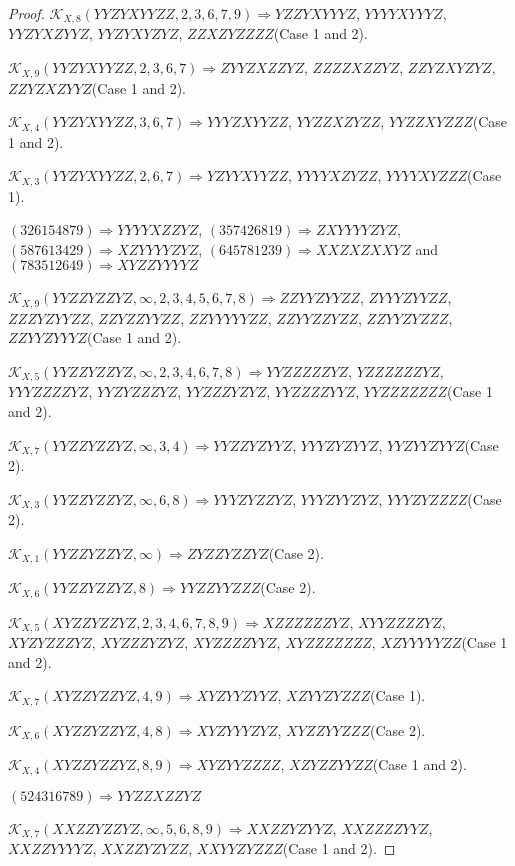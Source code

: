 \documentclass[12pt]{article}
\theoremstyle{plain}
\theoremstyle{definition}
\theoremstyle{remark}
\newcommand{\fancy}[1]{\mathcal{#1}}
\def\K{\fancy{K}}
\begin{document}
\begin{proof}
	
	$\K_{X,8}(YYZYXYYZZ,2, 3, 6, 7, 9)\Rightarrow $$YZZYXYYYZ$, $YYYYXYYYZ$, $YYZYXZYYZ$, $YYZYXYZYZ$, $ZZXZYZZZZ$(Case 1 and 2).
	
	$\K_{X,9}(YYZYXYYZZ,2, 3, 6, 7)\Rightarrow $$ZYYZXZZYZ$, $ZZZZXZZYZ$, $ZZYZXYZYZ$, $ZZYZXZYYZ$(Case 1 and 2).
	
	$\K_{X,4}(YYZYXYYZZ,3, 6, 7)\Rightarrow $$YYYZXYYZZ$, $YYZZXZYZZ$, $YYZZXYZZZ$(Case 1 and 2).
	
	$\K_{X,3}(YYZYXYYZZ,2, 6, 7)\Rightarrow $$YZYYXYYZZ$, $YYYYXZYZZ$, $YYYYXYZZZ$(Case 1).
	
	
	
	$(3 2 6 1 5 4 8 7 9)\Rightarrow YYYYXZZYZ$, $(3 5 7 4 2 6 8 1 9)\Rightarrow ZXYYYYZYZ$, $(5 8 7 6 1 3 4 2 9)\Rightarrow XZYYYYZYZ$, $(6 4 5 7 8 1 2 3 9)\Rightarrow XXZXZXXYZ$ and $(7 8 3 5 1 2 6 4 9)\Rightarrow XYZZYYYYZ$
	
	
	$\K_{X,9}(YYZZYZZYZ,\infty,2, 3, 4, 5, 6, 7, 8)\Rightarrow $$ZZYYZYYZZ$, $ZYYYZYYZZ$, $ZZZYZYYZZ$, $ZZYZZYYZZ$, $ZZYYYYYZZ$, $ZZYYZZYZZ$, $ZZYYZYZZZ$, $ZZYYZYYYZ$(Case 1 and 2).
	
	$\K_{X,5}(YYZZYZZYZ,\infty,2, 3, 4, 6, 7, 8)\Rightarrow $$YYZZZZZYZ$, $YZZZZZZYZ$, $YYYZZZZYZ$, $YYZYZZZYZ$, $YYZZZYZYZ$, $YYZZZZYYZ$, $YYZZZZZZZ$(Case 1 and 2).
	
	$\K_{X,7}(YYZZYZZYZ,\infty,3, 4)\Rightarrow $$YYZZYZYYZ$, $YYYZYZYYZ$, $YYZYYZYYZ$(Case 2).
	
	$\K_{X,3}(YYZZYZZYZ,\infty,6, 8)\Rightarrow $$YYYZYZZYZ$, $YYYZYYZYZ$, $YYYZYZZZZ$(Case 2).
	
	$\K_{X,1}(YYZZYZZYZ,\infty)\Rightarrow $$ZYZZYZZYZ$(Case 2).
	
	$\K_{X,6}(YYZZYZZYZ,8)\Rightarrow $$YYZZYYZZZ$(Case 2).
	
	$\K_{X,5}(XYZZYZZYZ,2, 3, 4, 6, 7, 8, 9)\Rightarrow $$XZZZZZZYZ$, $XYYZZZZYZ$, $XYZYZZZYZ$, $XYZZZYZYZ$, $XYZZZZYYZ$, $XYZZZZZZZ$, $XZYYYYYZZ$(Case 1 and 2).
	
	$\K_{X,7}(XYZZYZZYZ,4, 9)\Rightarrow $$XYZYYZYYZ$, $XZYYZYZZZ$(Case 1).
	
	$\K_{X,6}(XYZZYZZYZ,4, 8)\Rightarrow $$XYZYYYZYZ$, $XYZZYYZZZ$(Case 2).
	
	$\K_{X,4}(XYZZYZZYZ,8, 9)\Rightarrow $$XYZYYZZZZ$, $XZYZZYYZZ$(Case 1 and 2).
	
	
	
	$(5 2 4 3 1 6 7 8 9)\Rightarrow YYZZXZZYZ$
	
	
	$\K_{X,7}(XXZZYZZYZ,\infty,5, 6, 8, 9)\Rightarrow $$XXZZYZYYZ$, $XXZZZZYYZ$, $XXZZYYYYZ$, $XXZZYZYZZ$, $XXYYZYZZZ$(Case 1 and 2).
	

\end{proof}
\end{document}
